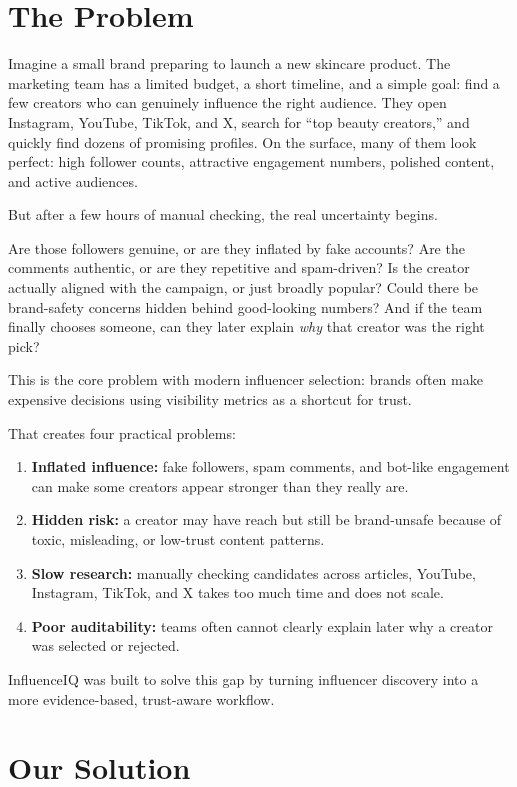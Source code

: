 \documentclass[11pt,a4paper]{article}
\begin{document}
\section{The Problem}

Imagine a small brand preparing to launch a new skincare product. The marketing team has a limited budget, a short timeline, and a simple goal: find a few creators who can genuinely influence the right audience. They open Instagram, YouTube, TikTok, and X, search for ``top beauty creators,'' and quickly find dozens of promising profiles. On the surface, many of them look perfect: high follower counts, attractive engagement numbers, polished content, and active audiences.

But after a few hours of manual checking, the real uncertainty begins.

Are those followers genuine, or are they inflated by fake accounts? Are the comments authentic, or are they repetitive and spam-driven? Is the creator actually aligned with the campaign, or just broadly popular? Could there be brand-safety concerns hidden behind good-looking numbers? And if the team finally chooses someone, can they later explain \emph{why} that creator was the right pick?

This is the core problem with modern influencer selection: brands often make expensive decisions using visibility metrics as a shortcut for trust.

That creates four practical problems:

\begin{enumerate}
  \item \textbf{Inflated influence:} fake followers, spam comments, and bot-like engagement can make some creators appear stronger than they really are.
  \item \textbf{Hidden risk:} a creator may have reach but still be brand-unsafe because of toxic, misleading, or low-trust content patterns.
  \item \textbf{Slow research:} manually checking candidates across articles, YouTube, Instagram, TikTok, and X takes too much time and does not scale.
  \item \textbf{Poor auditability:} teams often cannot clearly explain later why a creator was selected or rejected.
\end{enumerate}

InfluenceIQ was built to solve this gap by turning influencer discovery into a more evidence-based, trust-aware workflow.

\section{Our Solution}
\end{document}
